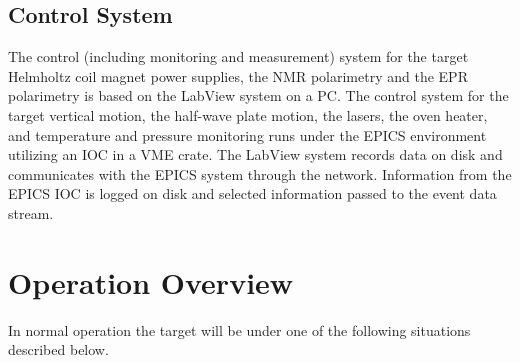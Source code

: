 \subsection{Control System}

The control (including monitoring and measurement) system for
the target Helmholtz coil magnet power supplies, the NMR polarimetry
and the EPR polarimetry is based on the LabView system on a PC.
The control system for the target vertical motion, the half-wave
plate motion, the lasers,
the oven heater, and temperature and pressure monitoring
runs under the EPICS environment utilizing
 an IOC in a VME crate. The LabView system 
records data on disk and communicates with the 
EPICS system through the network. Information from the EPICS IOC is logged 
on disk and selected information passed to the event data stream.


\section{Operation Overview}
\label{sec:Opover}

In normal operation the target will be under one of the following
situations described below.

